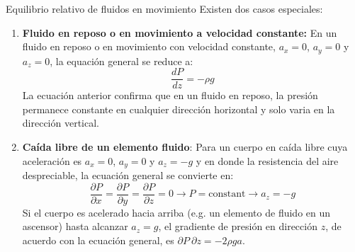 \documentclass [xcolor=svgnames, t] {beamer}
\begin{document}
\begin{frame}{Equilibrio relativo de fluidos en movimiento}
\small
\vspace{-0.4cm}
Existen dos casos especiales:
\begin{enumerate}
\item \textbf{Fluido en reposo o en movimiento a velocidad constante:}
En un fluido en reposo o en movimiento con velocidad constante, $a_x=0$, $a_y=0$ y $a_z=0$, la equaci\'on general se reduce a:
$$
\frac{d P}{d z} = -\rho g
$$
La ecuaci\'on anterior confirma que en un fluido en reposo, la presi\'on permanece constante en cualquier direcci\'on horizontal y solo varia en la direcci\'on vertical.

\item \textbf{Ca\'ida libre de un elemento fluido}: Para un cuerpo en ca\'ida libre cuya aceleraci\'on es $a_x =0$, $a_y =0$ y $a_z = -g$ y en donde la resistencia del aire despreciable, la ecuaci\'on general se convierte en:
$$
\frac{\partial P}{\partial x} =\frac{\partial P}{\partial y} =\frac{\partial P}{\partial z} = 0 \rightarrow P=\text{constant} \rightarrow a_z=-g
$$
Si el cuerpo es acelerado hacia arriba (e.g. un elemento de fluido en un ascensor) hasta alcanzar $a_z = g$, el gradiente de presi\'on en direcci\'on $z$, de acuerdo con la ecuaci\'on general, es $\partial P \ \partial z = -2\rho ga$.
\end{enumerate}
\end{frame}
\end{document}

